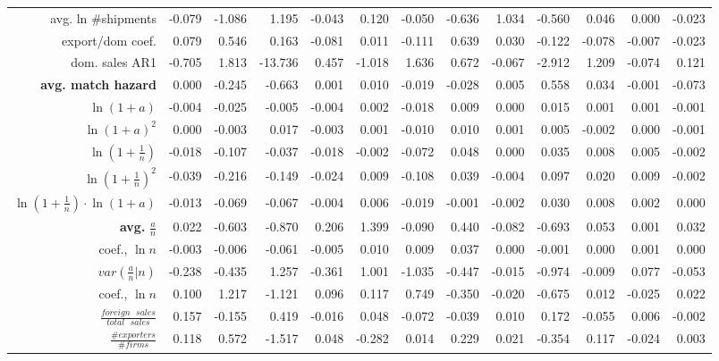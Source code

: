 \documentclass[12pt]{article}
\begin{document}
\begin{table}[tbp]
{\begin{tabular}{rrrrrrrrrrrrr}
avg. ln \#shipments & -0.079 & -1.086 & 1.195 & -0.043 & 0.120 & -0.050 & 
-0.636 & 1.034 & -0.560 & 0.046 & 0.000 & -0.023 \\ 
export/dom coef. & 0.079 & 0.546 & 0.163 & -0.081 & 0.011 & -0.111 & 0.639 & 
0.030 & -0.122 & -0.078 & -0.007 & -0.023 \\ 
dom. sales AR1 & -0.705 & 1.813 & -13.736 & 0.457 & -1.018 & 1.636 & 0.672 & 
-0.067 & -2.912 & 1.209 & -0.074 & 0.121 \\ 
\textbf{avg. match hazard} & 0.000 & -0.245 & -0.663 & 0.001 & 0.010 & -0.019
& -0.028 & 0.005 & 0.558 & 0.034 & -0.001 & -0.073 \\ 
$\ln (1+a)$ & -0.004 & -0.025 & -0.005 & -0.004 & 0.002 & -0.018 & 0.009 & 
0.000 & 0.015 & 0.001 & 0.001 & -0.001 \\ 
$\ln (1+a)^{2}$ & 0.000 & -0.003 & 0.017 & -0.003 & 0.001 & -0.010 & 0.010 & 
0.001 & 0.005 & -0.002 & 0.000 & -0.001 \\ 
$\ln (1+\frac{1}{n})$ & -0.018 & -0.107 & -0.037 & -0.018 & -0.002 & -0.072
& 0.048 & 0.000 & 0.035 & 0.008 & 0.005 & -0.002 \\ 
$\ln (1+\frac{1}{n})^{2}$ & -0.039 & -0.216 & -0.149 & -0.024 & 0.009 & 
-0.108 & 0.039 & -0.004 & 0.097 & 0.020 & 0.009 & -0.002 \\ 
$\ln (1+\frac{1}{n})\cdot \ln (1+a)$ & -0.013 & -0.069 & -0.067 & -0.004 & 
0.006 & -0.019 & -0.001 & -0.002 & 0.030 & 0.008 & 0.002 & 0.000 \\ 
\textbf{avg. }$\frac{a}{n}$ & 0.022 & -0.603 & -0.870 & 0.206 & 1.399 & 
-0.090 & 0.440 & -0.082 & -0.693 & 0.053 & 0.001 & 0.032 \\ 
coef., $\ln n$ & -0.003 & -0.006 & -0.061 & -0.005 & 0.010 & 0.009 & 0.037 & 
0.000 & -0.001 & 0.000 & 0.001 & 0.000 \\ 
$var(\frac{a}{n}|n)$ & -0.238 & -0.435 & 1.257 & -0.361 & 1.001 & -1.035 & 
-0.447 & -0.015 & -0.974 & -0.009 & 0.077 & -0.053 \\ 
coef., $\ln n$ & 0.100 & 1.217 & -1.121 & 0.096 & 0.117 & 0.749 & -0.350 & 
-0.020 & -0.675 & 0.012 & -0.025 & 0.022 \\ 
$\frac{foreign\text{ }sales}{total\text{ }sales}$ & 0.157 & -0.155 & 0.419 & 
-0.016 & 0.048 & -0.072 & -0.039 & 0.010 & 0.172 & -0.055 & 0.006 & -0.002
\\ 
$\frac{\#exporters}{\#firms}$ & 0.118 & 0.572 & -1.517 & 0.048 & -0.282 & 
0.014 & 0.229 & 0.021 & -0.354 & 0.117 & -0.024 & 0.003\end{tabular}}
\end{table}
\end{document}
